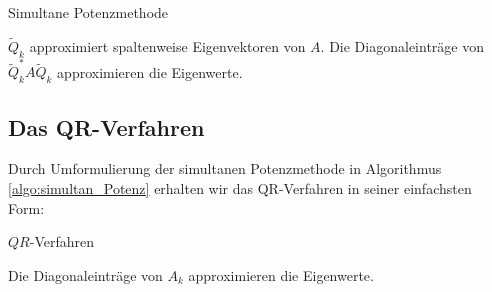 \documentclass[
]{mycourse}
\theoremstyle{mythm}
\theoremstyle{break}
\begin{document}
\begin{algorithm}
\caption{Simultane Potenzmethode}
\label{algo:simultan_Potenz}
\begin{algorithmic}
\ENDFOR
\RETURN $\tilde Q_k$ approximiert spaltenweise Eigenvektoren von $A$. Die Diagonaleinträge von $\tilde Q_k^* A \tilde Q_k$ approximieren die Eigenwerte.
\end{algorithmic}
\end{algorithm}

\subsection{Das QR-Verfahren}

Durch Umformulierung der simultanen Potenzmethode in Algorithmus \ref{algo:simultan_Potenz} erhalten wir das QR-Verfahren in seiner einfachsten Form:

\begin{algorithm}
\caption{$QR$-Verfahren}
\label{algo:QR_Eigenwerte}
\begin{algorithmic}
\ENDFOR
\RETURN Die Diagonaleinträge von $A_k$ approximieren die Eigenwerte.
\end{algorithmic}
\end{algorithm}
\end{document}
